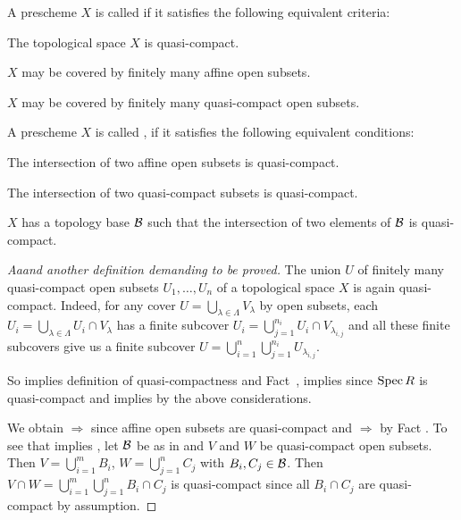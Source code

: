 \documentclass[a4paper,parskip=half,numbers=enddot, DIV=12]{scrreprt}
\begin{document}
\begin{defi}
    A prescheme $X$ is called  if it satisfies the following equivalent criteria:
    \begin{alphanumerate}
        \item 
            The topological space $X$ is quasi-compact.
        \item 
            $X$ may be covered by finitely many affine open subsets. 
        \item 
            $X$ may be covered by finitely many quasi-compact open subsets.
    \end{alphanumerate}
    A prescheme $X$ is called , if it satisfies the following equivalent conditions:
    \begin{alphanumerate}\setcounter{enumi}{3}
        \item 
            The intersection of two affine open subsets is quasi-compact.
        \item 
            The intersection of two quasi-compact subsets is quasi-compact. 
        \item 
            $X$ has a topology base $\mathcal{B}$ such that the intersection of two elements of $\mathcal{B}$ is quasi-compact.
    \end{alphanumerate}
\end{defi}
\begin{proof}[Aaand another definition demanding to be proved]
    The union $U$ of finitely many quasi-compact open subsets $U_1,\ldots,U_n$ of a topological space $X$ is again quasi-compact. Indeed, for any cover $U= \bigcup_{\lambda\in\Lambda} V_{\lambda}$ by open subsets, each $U_i = \bigcup_{\lambda\in \Lambda} U_i\cap V_\lambda$ has a finite subcover $U_i=\bigcup_{j=1}^{n_i}U_i\cap V_{\lambda_{i,j}}$ and all these finite subcovers give us a finite subcover $U = \bigcup_{i=1}^n \bigcup_{j=1}^{n_i} U_{\lambda_{i,j}}$. 
    
    So  implies  definition of quasi-compactness and Fact~,  implies  since $\operatorname{Spec} R$ is quasi-compact and  implies  by the above considerations. 
    
    We obtain  $\Rightarrow$  since affine open subsets are quasi-compact and  $\Rightarrow$  by Fact . To see that  implies , let $\mathcal{B}$ be as in  and $V$ and $W$ be quasi-compact open subsets. Then $V= \bigcup_{i=1}^m B_i$, $W=\bigcup_{j=1}^n C_j$ with $B_i,C_j\in \mathcal{B}$. Then $V\cap W = \bigcup_{i=1}^m \bigcup_{j=1}^n B_i\cap C_j$ is quasi-compact since all $B_i\cap C_j$ are quasi-compact by assumption.
\end{proof}
\end{document}
